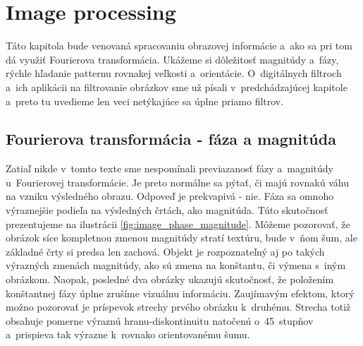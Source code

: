 \section{Image processing}

Táto kapitola bude venovaná spracovaniu obrazovej informácie a~ako sa
pri tom dá využiť Fourierova transformácia. Ukážeme si dôležitosť
magnitúdy a~fázy, rýchle hľadanie patternu rovnakej
veľkosti a~orientácie. O~digitálnych filtroch a~ich aplikácii
na filtrovanie obrázkov sme už písali v~predchádzajúcej kapitole 
a~preto tu uvedieme len veci netýkajúce sa úplne priamo filtrov.

\subsection{Fourierova transformácia - fáza a magnitúda}
Zatiaľ nikde v~tomto texte sme nespomínali previazanosť fázy 
a~magnitúdy u~Fourierovej transformácie. Je preto normálne sa pýtať, či
majú rovnakú váhu na vzniku výsledného obrazu. Odpoveď je prekvapivá -
nie. Fáza sa omnoho výraznejšie podieľa na výsledných črtách, ako
magnitúda. Túto skutočnosť prezentujeme na ilustrácii
\ref{fig:image_phase_magnitude}. Môžeme pozorovať, že obrázok síce
kompletnou zmenou magnitúdy stratí textúru, bude v~ňom šum, ale
základné črty si predsa len zachová. Objekt je rozpoznateľný aj po
takých výrazných zmenách magnitúdy, ako sú zmena na konštantu, či
výmena s~iným obrázkom. Naopak, posledné dva obrázky ukazujú skutočnosť,
že položením konštantnej fázy úplne zrušíme vizuálnu informáciu.
Zaujímavým efektom, ktorý možno pozorovať je príspevok strechy prvého
obrázku k~druhému. Strecha totiž obsahuje pomerne výraznú
hranu-diskontinuitu natočenú o~45~stupňov a~prispieva tak výrazne
k~rovnako orientovanému šumu.

